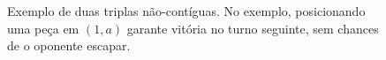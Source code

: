 \documentclass{article}
\begin{document}
    \begin{figure}
        \centering
        \caption{Exemplo de duas triplas não-contíguas. No
        exemplo, posicionando uma peça em $(1, a)$ garante
        vitória no turno seguinte, sem chances de o oponente
        escapar.\label{win-shared-triple}}
        \begin{othelloboard}{1}
            \dotmarkings{}
        \end{othelloboard}
    \end{figure}
\end{document}
